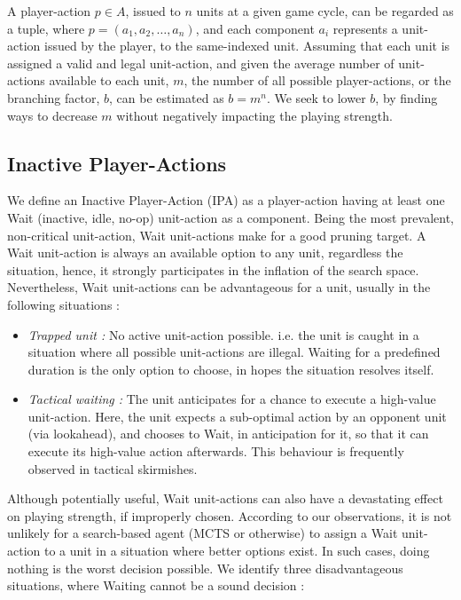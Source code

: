 \documentclass[conference]{IEEEtran}
\begin{document}
A player-action $p \in A$, issued to $n$ units at a given game cycle, can be regarded as a tuple, where $p = (a_1, a_2, \dots, a_n)$, and each component $a_i$ represents a unit-action issued by the player, to the same-indexed unit. Assuming that each unit is assigned a valid and legal unit-action, and given the average number of unit-actions available to each unit, $m$, the number of all possible player-actions, or the branching factor, $b$, can be estimated as $b = m^n$. We seek to lower $b$, by finding ways to decrease $m$ without negatively impacting the playing strength.


\subsection{Inactive Player-Actions}

We define an Inactive Player-Action (IPA) as a player-action having at least one Wait (inactive, idle, no-op) unit-action as a component. Being the most prevalent, non-critical unit-action, Wait unit-actions make for a good pruning target. A Wait unit-action is always an available option to any unit, regardless the situation, hence, it strongly participates in the inflation of the search space. Nevertheless, Wait unit-actions can be advantageous for a unit, usually in the following situations :

\begin{itemize}
\item \textit{Trapped unit :} No active unit-action possible. i.e. the unit is caught in a situation where all possible unit-actions are illegal. Waiting for a predefined duration is the only option to choose, in hopes the situation resolves itself.
\item \textit{Tactical waiting :} The unit anticipates for a chance to execute a high-value unit-action. Here, the unit expects a sub-optimal action by an opponent unit (via lookahead), and chooses to Wait, in anticipation for it, so that it can execute its high-value action afterwards. This behaviour is frequently observed in tactical skirmishes.
\end{itemize}

Although potentially useful, Wait unit-actions can also have a devastating effect on playing strength, if improperly chosen. According to our observations, it is not unlikely for a search-based agent (MCTS or otherwise) to assign a Wait unit-action to a unit in a situation where better options exist. In such cases, doing nothing is the worst decision possible. We identify three disadvantageous situations, where Waiting cannot be a sound decision :
\end{document}

